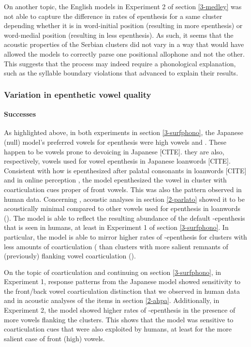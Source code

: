 {On another topic, the English models in Experiment 2 of section \ref{3-medley} was not able to capture the difference in rates of epenthesis for a same cluster depending whether it is in word-initial position (resulting in more epenthesis) or word-medial position (resulting in less epenthesis). As such, it seems that the acoustic properties of the Serbian clusters did not vary in a way that would have allowed the models to correctly parse one positional allophone and not the other. This suggests that the process may indeed require a phonological explanation, such as the syllable boundary violations that \cite{kabak2007} advanced to explain their results.  

\subsubsection{Variation in epenthetic vowel quality}
\paragraph{Successes}
As highlighted above, in both experiments in section \ref{3-surfphono}, the Japanese (null) model's preferred vowels for epenthesis were high vowels  and . These happen to be vowels prone to devoicing in Japanese {\color{red}[CITE]}. they are also, respectively, vowels used for vowel epenthesis in Japanese loanwords {\color{red}[CITE]}. Consistent with how  is epenthesized after palatal consonants in loanwords {\color{red}[CITE]} and in online perception \cite{mattingley2015}, the model epenthesized the vowel  in cluster with coarticulation cues proper of front vowels. This was also the pattern observed in human data. Concerning , acoustic analyses in section \ref{2-parlato} showed it to be acoustically minimal compared to other vowels used for epenthesis in loanwords (). The model is able to reflect the resulting abundance of the default -epenthesis that is seen in humans, at least in Experiment 1 of section \ref{3-surfphono}. In particular, the model is able to mirror higher rates of -epenthesis for clusters with less amounts of coarticulation ( than clusters with more salient remnants of (previously) flanking vowel coarticulation (). 

On the topic of coarticulation and continuing on section \ref{3-surfphono}, in Experiment 1, response patterns from the Japanese model showed sensitivity to the front/back vowel coarticulation distinction that we observed in human data and in acoustic analyses of the items in section \ref{2-ahpa}. Additionally, in Experiment 2, the model showed higher rates of -epenthesis in the presence of more  vowels flanking the clusters. This shows that the model was sensitive to coarticulation cues that were also exploited by humans, at least for the more salient case of front (high) vowels.

}
